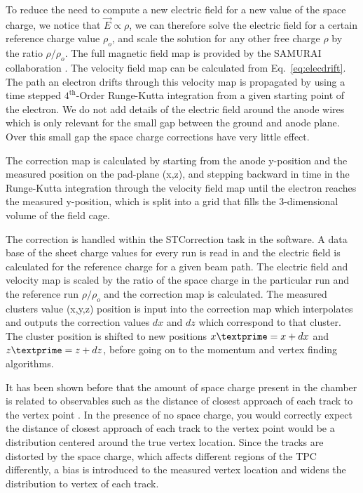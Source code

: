  To reduce the need to compute a new electric field for a new value of the space charge, we notice that $\vec{E}\propto \rho$, we can therefore solve the electric field for a certain reference charge value $\rho_o$, and scale the solution for any other free charge $\rho$ by the ratio $\rho/\rho_o$. The full magnetic field map is provided by the SAMURAI collaboration \cite{magnet}. The velocity field map can be calculated from Eq.~\ref{eq:elecdrift}. The path an electron drifts through this velocity map is propagated by using a time stepped $\mathrm{4}^{\mathrm{th}}$-Order Runge-Kutta integration from a given starting point of the electron. We do not add details of the electric field around the anode wires which is only relevant for the small gap between the ground and anode plane. Over this small gap the space charge corrections have very little effect. 
 
 The correction map is calculated by starting from the anode y-position and the measured position on the pad-plane (x,z), and stepping backward in time in the Runge-Kutta integration through the velocity field map until the electron reaches the measured y-position, which is split into a grid that fills the 3-dimensional volume of the field cage. 
 
 The correction is handled within the STCorrection task in the software. A data base of the sheet charge values for every run is read in and the electric field is calculated for the reference charge for a given beam path. The electric field and velocity map is scaled by the ratio of the space charge in the particular run and the reference run $\rho/\rho_o$ and the correction map is calculated. The measured clusters value (x,y,z) position is input into the correction map which interpolates and outputs the correction values $dx$ and $dz$ which correspond to that cluster. The cluster position is shifted to new positions $x\textprime = x + dx$ and $z\textprime = z + dz$, before going on to the momentum and vertex finding algorithms.  
 
 It has been shown before that the amount of space charge present in the chamber is related to observables such as the distance of closest approach of each track to the vertex point \cite{starSC}. In the presence of no space charge, you would correctly expect the distance of closest approach of each track to the vertex point would be a distribution centered around the true vertex location. Since the tracks are distorted by the space charge, which affects different regions of the TPC differently, a bias is introduced to the measured vertex location and widens the distribution to vertex of each track.  

